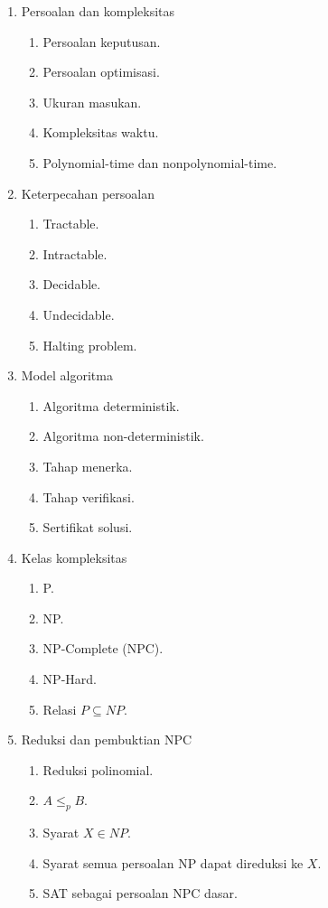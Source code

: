 \begin{enumerate}
    \item Persoalan dan kompleksitas
    \begin{enumerate}
        \item Persoalan keputusan.
        \item Persoalan optimisasi.
        \item Ukuran masukan.
        \item Kompleksitas waktu.
        \item Polynomial-time dan nonpolynomial-time.
    \end{enumerate}

    \item Keterpecahan persoalan
    \begin{enumerate}
        \item Tractable.
        \item Intractable.
        \item Decidable.
        \item Undecidable.
        \item Halting problem.
    \end{enumerate}

    \item Model algoritma
    \begin{enumerate}
        \item Algoritma deterministik.
        \item Algoritma non-deterministik.
        \item Tahap menerka.
        \item Tahap verifikasi.
        \item Sertifikat solusi.
    \end{enumerate}

    \item Kelas kompleksitas
    \begin{enumerate}
        \item P.
        \item NP.
        \item NP-Complete (NPC).
        \item NP-Hard.
        \item Relasi $P\subseteq NP$.
    \end{enumerate}

    \item Reduksi dan pembuktian NPC
    \begin{enumerate}
        \item Reduksi polinomial.
        \item $A\le_p B$.
        \item Syarat $X\in NP$.
        \item Syarat semua persoalan NP dapat direduksi ke $X$.
        \item SAT sebagai persoalan NPC dasar.
    \end{enumerate}


\end{enumerate}
